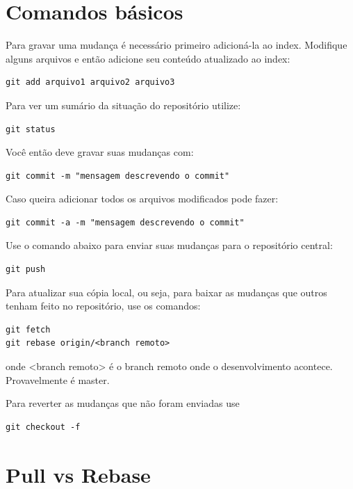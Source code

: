 \documentclass[12pt,brazil]{book}
\begin{document}
\section{Comandos básicos}
\label{sec:comandos-basicos}

Para gravar uma mudança é necessário primeiro adicioná-la ao
index. Modifique alguns arquivos e então adicione seu conteúdo
atualizado ao index:

\begin{verbatim}
git add arquivo1 arquivo2 arquivo3
\end{verbatim}

Para ver um sumário da situação do repositório utilize:

\begin{verbatim}
git status
\end{verbatim}

Você então deve gravar suas mudanças com:

\begin{verbatim}
git commit -m "mensagem descrevendo o commit"
\end{verbatim}

Caso queira adicionar todos os arquivos modificados pode fazer:

\begin{verbatim}
git commit -a -m "mensagem descrevendo o commit"
\end{verbatim}

Use o comando abaixo para enviar suas mudanças para o repositório
central:

\begin{verbatim}
git push
\end{verbatim}

Para atualizar sua cópia local, ou seja, para baixar as mudanças que
outros tenham feito no repositório, use os comandos:

\begin{verbatim}
git fetch
git rebase origin/<branch remoto>
\end{verbatim}

onde <branch remoto> é o branch remoto onde o desenvolvimento
acontece. Provavelmente é master.

Para reverter as mudanças que não foram enviadas use

\begin{verbatim}
git checkout -f
\end{verbatim}


\section{Pull vs Rebase}
\end{document}
